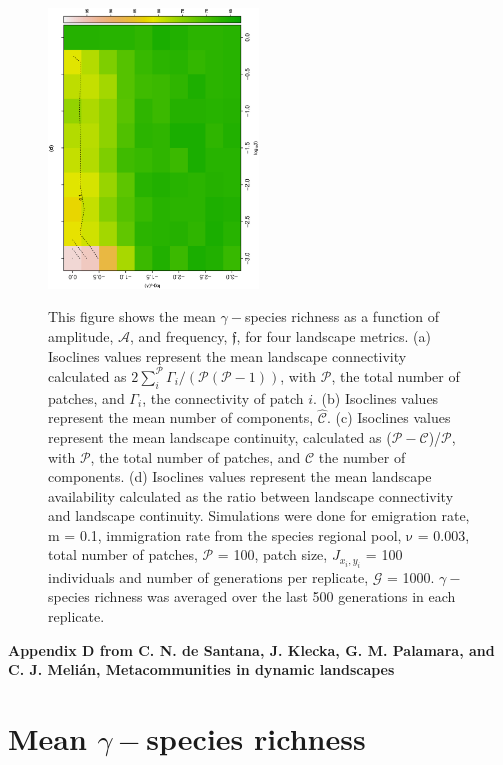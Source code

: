 \documentclass[12pt]{article}
\begin{document}
\begin{figure}[hb!]
\begin{center}
\includegraphics[width=2.2in, angle=-90]{./figures/Figure6_Mean_d_003.eps}\\

\end{center}
\caption{This figure shows the mean $\gamma-$species richness as a function of amplitude, $\mathcal{A}$, and frequency, $\mathfrak{f}$, for four landscape metrics. (a) Isoclines values represent the mean landscape connectivity calculated as $2\sum_{i}^{\mathcal{P}} \Gamma_{i}/(\mathcal{P}(\mathcal{P} - 1))$, with $\mathcal{P}$, the total number of patches, and $\Gamma_{i}$, the connectivity of patch $i$. (b) Isoclines values represent the mean number of components, $\hat{\mathcal{C}}$. (c) Isoclines values represent the mean landscape continuity, calculated as ($\mathcal{P} - \mathcal{C}$)/$\mathcal{P}$, with $\mathcal{P}$, the total number of patches, and $\mathcal{C}$ the number of components. (d) Isoclines values represent the mean landscape availability calculated as the ratio between landscape connectivity and landscape continuity. Simulations were done for emigration rate, $\mathrm{m}$ = 0.1, immigration rate from the species regional pool, $\mathrm{\nu}$ = 0.003, total number of patches, $\mathcal{P}$ = 100, patch size, $J_{x_i,y_i}$ = 100 individuals and number of generations per replicate, $\mathcal{G}$ = 1000. $\gamma-$species richness was averaged over the last 500 generations in each replicate.}
\label{fig:SI-C1}
\end{figure}

\clearpage
\begin{flushleft} 
{\Large \textbf{Appendix D from C. N. de Santana, J. Klecka, G. M. Palamara, and C. J. Meli\'{a}n, Metacommunities in dynamic landscapes}}
\section*{Mean $\gamma-$species richness}
\end{flushleft}
\renewcommand{\theequation}{D-\arabic{equation}}
\setcounter{equation}{0}
\renewcommand{\thesection}{D\arabic{section}}
\renewcommand{\thefigure}{D\arabic{figure}}
\renewcommand{\thetable}{D\arabic{table}}
\setcounter{figure}{0}
\setcounter{table}{0}
\end{document}
